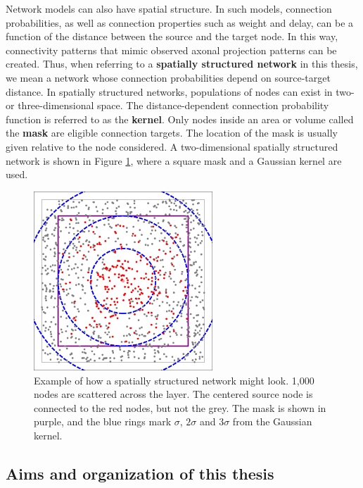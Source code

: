 Network models can also have spatial structure. In such models, connection probabilities, as well as connection properties such as weight and delay, can be a function of the distance between the source and the target node. In this way, connectivity patterns that mimic observed axonal projection patterns can be created. Thus, when referring to a {\bf spatially structured network} in this thesis, we mean a network whose connection probabilities depend on source-target distance. In spatially structured networks, populations of nodes can exist in two- or three-dimensional space. The distance-dependent connection probability function is referred to as the {\bf kernel}. Only nodes inside an area or volume called the {\bf mask} are eligible connection targets. The location of the mask is usually given relative to the node considered. A two-dimensional spatially structured network is shown in Figure \ref{fig:spatial_example_intro}, where a square mask and a Gaussian kernel are used.

\begin{figure}[h]
  \centering
  \includegraphics[width=0.6\textwidth]{TopologyExample3D.pdf}
  \caption[A spatially structured network]{Example of how a spatially structured network might look. 1,000 nodes are scattered across the layer. The centered source node is connected to the red nodes, but not the grey. The mask is shown in purple, and the blue rings mark $\sigma$, $2\sigma$ and $3\sigma$ from the Gaussian kernel. }
  \label{fig:spatial_example_intro}
\end{figure}



\subsection*{Aims and organization of this thesis}


